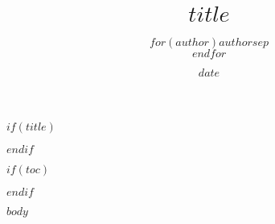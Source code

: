 \documentclass[10pt,a4paper]{article}
\title{$title$}
\author{$for(author)$$author$$sep$\\$endfor$}
\date{$date$}
\begin{document}
$if(title)$
\maketitle
\begin{multicols}{2}
$endif$

$if(toc)$
\tableofcontents

$endif$

\providecommand{\tightlist}{%
  \setlength{\itemsep}{0pt}\setlength{\parskip}{0pt}}

  $body$

\end{multicols}
\end{document}
